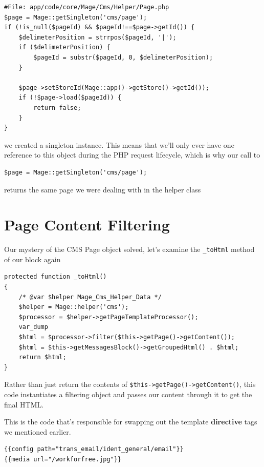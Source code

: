 \documentclass[oneside]{book}
\begin{document}
\begin{lstlisting}
#File: app/code/core/Mage/Cms/Helper/Page.php
$page = Mage::getSingleton('cms/page');
if (!is_null($pageId) && $pageId!==$page->getId()) {
    $delimeterPosition = strrpos($pageId, '|');
    if ($delimeterPosition) {
        $pageId = substr($pageId, 0, $delimeterPosition);
    }

    $page->setStoreId(Mage::app()->getStore()->getId());
    if (!$page->load($pageId)) {
        return false;
    }
}

\end{lstlisting}


we created a singleton instance.  This means that we'll only ever have one reference to this object during the PHP request lifecycle, which is why our call to

\begin{lstlisting}
$page = Mage::getSingleton('cms/page');

\end{lstlisting}


returns the same page we were dealing with in the helper class

\section{Page Content Filtering}

Our mystery of the CMS Page object solved, let's examine the \footnotesize\texttt{\_toHtml} \normalsize  method of our block again

\begin{lstlisting}
protected function _toHtml()
{
    /* @var $helper Mage_Cms_Helper_Data */
    $helper = Mage::helper('cms');
    $processor = $helper->getPageTemplateProcessor();
    var_dump
    $html = $processor->filter($this->getPage()->getContent());
    $html = $this->getMessagesBlock()->getGroupedHtml() . $html;
    return $html;
}

\end{lstlisting}


Rather than just return the contents of \footnotesize\texttt{\$this-\textgreater getPage()-\textgreater getContent()}\normalsize, this code instantiates a filtering object and passes our content through it to get the final HTML.

This is the code that's responsible for swapping out the template \textbf{directive} tags we mentioned earlier.

\begin{lstlisting}
{{config path="trans_email/ident_general/email"}}
{{media url="/workforfree.jpg"}}

\end{lstlisting}
\end{document}
